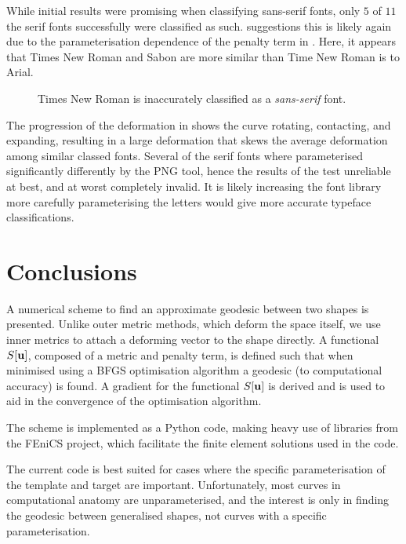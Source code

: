 \documentclass[a4paper, 12pt]{article}
\begin{document}
While initial results were promising when classifying sans-serif fonts, only $5$
of $11$ the serif fonts successfully were classified as such. 
suggestions this is likely again due to the parameterisation dependence of the
penalty term in . Here, it appears that Times New Roman and Sabon are more
similar than Time New Roman is to Arial. 

\begin{figure}[h!]
  \centering
\caption{Times New Roman is inaccurately classified as a \emph{sans-serif} font.}
  \label{fig:font_wrong}
\end{figure}

The progression of the deformation in  shows the curve rotating,
contacting, and expanding, resulting in a large deformation that skews the
average deformation among similar classed fonts. Several of the serif fonts
where parameterised significantly differently by the PNG tool, hence the results
of the test unreliable at best, and at worst completely invalid. It is likely
increasing the font library more carefully parameterising the letters would
give more accurate typeface classifications.
 

\section{Conclusions\label{sec:conc}}

A numerical scheme to find an approximate geodesic between two shapes is
presented. Unlike outer metric methods, which deform the space itself, we use
inner metrics to attach a deforming vector to the shape directly. A functional
$S[\mathbf{u}]$, composed of a metric and penalty term, is defined such that when
minimised using a BFGS optimisation algorithm a geodesic (to computational
accuracy) is found. A gradient for the functional $S[\mathbf{u}]$ is derived
and is used to aid in the convergence of the optimisation algorithm.

The scheme is implemented as a Python code, making heavy use of libraries from the FEniCS project,
which facilitate the finite element solutions used in the code.

The current code is best suited for cases where the specific parameterisation of the
template and target are important. Unfortunately, most curves in computational
anatomy are unparameterised, and the interest is only in finding the geodesic
between generalised shapes, not curves with a specific parameterisation.
\end{document}
